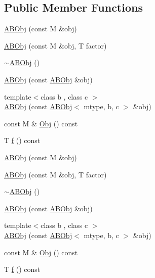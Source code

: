 \subsection*{Public Member Functions}
\begin{DoxyCompactItemize}
\item 
\mbox{\hyperlink{classROOT_1_1Minuit2_1_1ABObj_a48561e673ca2a4a05b9e67af09b1736a}{A\+B\+Obj}} (const M \&obj)
\item 
\mbox{\hyperlink{classROOT_1_1Minuit2_1_1ABObj_a2406012a4e1bd70d0a92c2468eaaee7c}{A\+B\+Obj}} (const M \&obj, T factor)
\item 
\mbox{\hyperlink{classROOT_1_1Minuit2_1_1ABObj_ad6145e561d3c760d83a3481c3933bb98}{$\sim$\+A\+B\+Obj}} ()
\item 
\mbox{\hyperlink{classROOT_1_1Minuit2_1_1ABObj_a2cce5325151c97bcaaec6cb6ecc0cd7b}{A\+B\+Obj}} (const \mbox{\hyperlink{classROOT_1_1Minuit2_1_1ABObj}{A\+B\+Obj}} \&obj)
\item 
{\footnotesize template$<$class b , class c $>$ }\\\mbox{\hyperlink{classROOT_1_1Minuit2_1_1ABObj_af629f9c316122395ab94459e6cf6ed30}{A\+B\+Obj}} (const \mbox{\hyperlink{classROOT_1_1Minuit2_1_1ABObj}{A\+B\+Obj}}$<$ mtype, b, c $>$ \&obj)
\item 
const M \& \mbox{\hyperlink{classROOT_1_1Minuit2_1_1ABObj_a82bf2a4359c24b894e4e8990185432c1}{Obj}} () const
\item 
T \mbox{\hyperlink{classROOT_1_1Minuit2_1_1ABObj_aa640f928a8ec245b70d4ac294e1418e5}{f}} () const
\item 
\mbox{\hyperlink{classROOT_1_1Minuit2_1_1ABObj_a48561e673ca2a4a05b9e67af09b1736a}{A\+B\+Obj}} (const M \&obj)
\item 
\mbox{\hyperlink{classROOT_1_1Minuit2_1_1ABObj_a2406012a4e1bd70d0a92c2468eaaee7c}{A\+B\+Obj}} (const M \&obj, T factor)
\item 
\mbox{\hyperlink{classROOT_1_1Minuit2_1_1ABObj_ad6145e561d3c760d83a3481c3933bb98}{$\sim$\+A\+B\+Obj}} ()
\item 
\mbox{\hyperlink{classROOT_1_1Minuit2_1_1ABObj_a2cce5325151c97bcaaec6cb6ecc0cd7b}{A\+B\+Obj}} (const \mbox{\hyperlink{classROOT_1_1Minuit2_1_1ABObj}{A\+B\+Obj}} \&obj)
\item 
{\footnotesize template$<$class b , class c $>$ }\\\mbox{\hyperlink{classROOT_1_1Minuit2_1_1ABObj_af629f9c316122395ab94459e6cf6ed30}{A\+B\+Obj}} (const \mbox{\hyperlink{classROOT_1_1Minuit2_1_1ABObj}{A\+B\+Obj}}$<$ mtype, b, c $>$ \&obj)
\item 
const M \& \mbox{\hyperlink{classROOT_1_1Minuit2_1_1ABObj_a82bf2a4359c24b894e4e8990185432c1}{Obj}} () const
\item 
T \mbox{\hyperlink{classROOT_1_1Minuit2_1_1ABObj_aa640f928a8ec245b70d4ac294e1418e5}{f}} () const
\end{DoxyCompactItemize}


